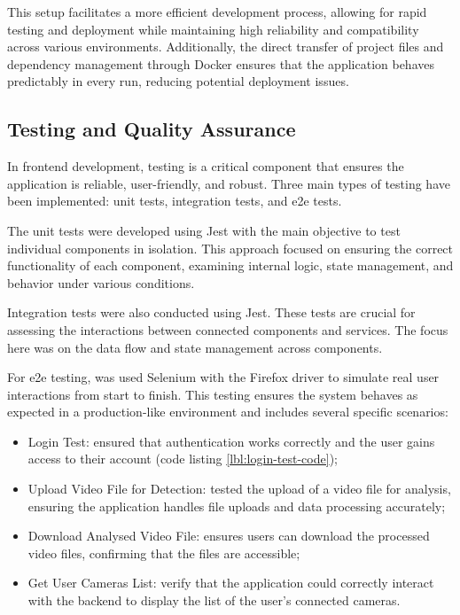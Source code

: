 This setup facilitates a more efficient development process, allowing for rapid testing and deployment while maintaining 
high reliability and compatibility across various environments. Additionally, the direct transfer of project files 
and dependency management through Docker ensures that the application behaves predictably in every run, reducing 
potential deployment issues.
\subsection{Testing and Quality Assurance}

In frontend development, testing is a critical component that ensures the application is reliable, 
user-friendly, and robust. Three main types of testing have been implemented: unit tests, integration tests, 
and \ac{e2e} tests.


The unit tests were developed using Jest \cite{rfc60} with the main objective to test individual components in isolation. 
This approach focused on ensuring the correct functionality of each component, examining internal logic, state 
management, and behavior under various conditions.

Integration tests were also conducted using Jest. These tests are crucial for assessing the interactions between 
connected components and services. The focus here was on the data flow and state management across components.

For \ac{e2e} testing, was used Selenium \cite{rfc61} with the Firefox driver \cite{rfc62} to simulate real user interactions from start to finish. 
This testing ensures the system behaves as expected in a production-like environment and includes several specific 
scenarios:

\begin{itemize}
    \item Login Test: ensured that authentication works correctly 
    and the user gains access to their account (code listing \ref{lbl:login-test-code});
    \item Upload Video File for Detection: tested the upload of a video file for 
    analysis, ensuring the application handles file uploads and data processing accurately;
    \item Download Analysed Video File: ensures users can download the processed video files, 
    confirming that the files are accessible;
    \item Get User Cameras List: verify that the application could correctly interact with the backend to 
    display the list of the user's connected cameras.
\end{itemize}


